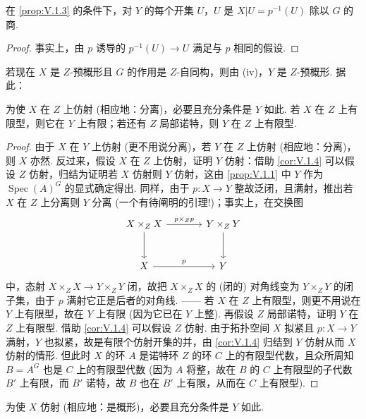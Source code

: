 \begin{corollary}\label{cor:V.1.4}
在 \ref{prop:V.1.3} 的条件下，对 $Y$ 的每个开集 $U$，$U$ 是 $X|U = p^{-1}(U)$ 除以 $G$ 的商.
\end{corollary}

\begin{proof}
事实上，由 $p$ 诱导的 $p^{-1}(U) \to U$ 满足与 $p$ 相同的假设.
\end{proof}

若现在 $X$ 是 $Z$-预概形且 $G$ 的作用是 $Z$-自同构，则由 (iv)，$Y$ 是 $Z$-预概形. 据此：

\begin{corollary}\label{cor:V.1.5}
为使 $X$ 在 $Z$ 上仿射 (相应地：分离)，必要且充分条件是 $Y$ 如此. 若 $X$ 在 $Z$ 上有限型，则它在 $Y$ 上有限；若还有 $Z$ 局部诺特，则 $Y$ 在 $Z$ 上有限型.
\end{corollary}

\begin{proof}
由于 $X$ 在 $Y$ 上仿射 (更不用说分离)，若 $Y$ 在 $Z$ 上仿射 (相应地：分离)，则 $X$ 亦然. 反过来，假设 $X$ 在 $Z$ 上仿射，证明 $Y$ 仿射：借助 \ref{cor:V.1.4} 可以假设 $Z$ 仿射，归结为证明若 $X$ 仿射则 $Y$ 仿射，这由 \ref{prop:V.1.1} 中 $Y$ 作为 $\operatorname{Spec}(A)^{G}$ 的显式确定得出. 同样，由于 $p \colon X \to Y$ 整故泛闭，且满射，推出若 $X$ 在 $Z$ 上分离则 $Y$ 分离 (一个有待阐明的引理!)；事实上，在交换图
\[
\begin{tikzcd}[row sep=large, column sep=large]
X \times_Z X \arrow[r,"p \times_Z p"] \arrow[d] & Y \times_Z Y \arrow[d] \\
X \arrow[r,"p"] & Y
\end{tikzcd}
\]
中，态射 $X \times_Z X \to Y \times_Z Y$ 闭，故把 $X \times_Z X$ 的 (闭的) 对角线变为 $Y \times_Z Y$ 的闭子集，由于 $p$ 满射它正是后者的对角线. —— 若 $X$ 在 $Z$ 上有限型，则更不用说在 $Y$ 上有限型，故在 $Y$ 上有限 (因为它已在 $Y$ 上整). 再假设 $Z$ 局部诺特，证明 $Y$ 在 $Z$ 上有限型. 借助 \ref{cor:V.1.4} 可以假设 $Z$ 仿射. 由于拓扑空间 $X$ 拟紧且 $p \colon X \to Y$ 满射，$Y$ 也拟紧，故是有限个仿射开集的并，由 \ref{cor:V.1.4} 归结到 $Y$ 仿射从而 $X$ 仿射的情形. 但此时 $X$ 的环 $A$ 是诺特环 $Z$ 的环 $C$ 上的有限型代数，且众所周知 $B = A^{G}$ 也是 $C$ 上的有限型代数 (因为 $A$ 将整，故在 $B$ 的 $C$ 上有限型的子代数 $B'$ 上有限，而 $B'$ 诺特，故 $B$ 也在 $B'$ 上有限，从而在 $C$ 上有限型).
\end{proof}

\begin{corollary}\label{cor:V.1.6}
为使 $X$ 仿射 (相应地：是概形)，必要且充分条件是 $Y$ 如此.
\end{corollary}


